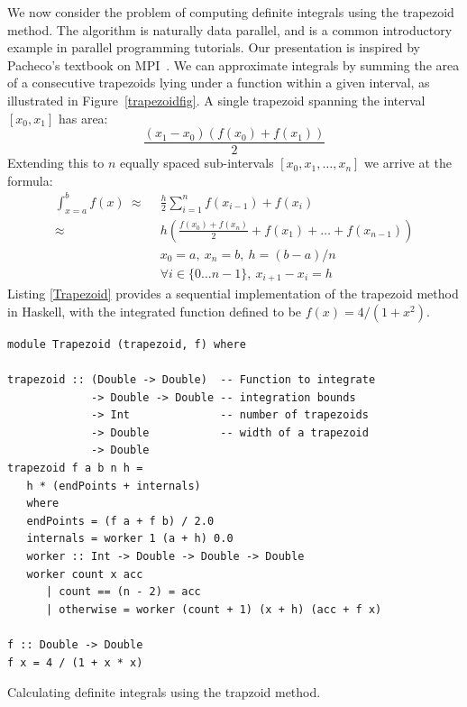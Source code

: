 \documentclass{tmr}
\begin{document}
We now consider the problem of computing definite integrals
using the trapezoid method. The algorithm is naturally data parallel, and is a common
introductory example in parallel programming tutorials. Our presentation is inspired by
Pacheco's textbook on MPI~\cite{Pacheco}.
We can approximate integrals by summing the area of a consecutive
trapezoids lying under a function within a given interval, as illustrated in
Figure~\ref{trapezoidfig}. A single trapezoid spanning the interval
$[x_0,x_1]$ has area:
\begin{equation*}
\frac{(x_1 - x_0)(f(x_0) + f(x_1))}{2}
\end{equation*}
Extending this to $n$ equally spaced sub-intervals $[x_0,x_1,\ldots,x_n]$ we arrive at the formula:
\begin{equation*}
\begin{split}
\int_{x=a}^{b} f(x)\ \approx\ &\ \frac{h}{2} \sum_{i=1}^n f(x_{i-1}) + f(x_i) \\[3mm]
                     \approx\ &\ h \left(\frac{f(x_0) + f(x_n)}{2} + f(x_1) + \ldots + f(x_{n-1})\right) \\[3mm]
                     &\ x_0 = a,\ x_n = b,\ h = (b - a)/n\\
                     &\ \forall i \in \{0 \ldots n-1\},\ x_{i+1} - x_{i} = h
\end{split}
\end{equation*}
Listing \ref{Trapezoid} provides a sequential implementation of the trapezoid method in Haskell, with
the integrated function defined to be $f(x) = 4 / (1 + x^2)$.

\begin{listing}
\begin{Verbatim}
module Trapezoid (trapezoid, f) where

trapezoid :: (Double -> Double)  -- Function to integrate
             -> Double -> Double -- integration bounds
             -> Int              -- number of trapezoids
             -> Double           -- width of a trapezoid
             -> Double
trapezoid f a b n h =
   h * (endPoints + internals)
   where
   endPoints = (f a + f b) / 2.0
   internals = worker 1 (a + h) 0.0
   worker :: Int -> Double -> Double -> Double
   worker count x acc
      | count == (n - 2) = acc
      | otherwise = worker (count + 1) (x + h) (acc + f x)

f :: Double -> Double
f x = 4 / (1 + x * x)
\end{Verbatim}
\caption{Calculating definite integrals using the trapzoid method. \label{Trapezoid}}
\end{listing}
\end{document}
